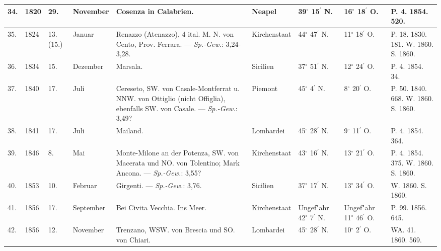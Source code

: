 \documentclass[a4paper, 8pt, oneside, polutonikogreek, german]{article}
\begin{document}
\begin{center}
\begin{longtable}{|p{3mm}|p{10mm}|p{5mm}|p{13mm}|p{25mm}|p{15mm}|p{10mm}|p{10mm}|p{11mm}|}
        34. & 1820 & 29. & November & Cosenza in Calabrien. & Neapel & 39$^\circ$ 15$^\prime$ N. & 16$^\circ$ 18$^\prime$ O. & P. 4. 1854. 520. \\ \hline
        35. & 1824 & 13. (15.) & Januar & Renazzo (Atenazzo), 4 ital. M. N. von Cento, Prov. Ferrara. --- \emph{Sp.-Gew.}: 3,24-3,28. & Kirchenstaat & 44$^\circ$ 47$^\prime$ N. & 11$^\circ$ 18$^\prime$ O. & P. 18. 1830. 181. W. 1860. S. 1860. \\ \hline
        36. & 1834 & 15. & Dezember & Marsala. & Sicilien & 37$^\circ$ 51$^\prime$ N. & 12$^\circ$ 24$^\prime$ O. & P. 4. 1854. 34. \\ \hline
        37. & 1840 & 17. & Juli & Cereseto, SW. von Casale-Montferrat u. NNW. von Ottiglio (nicht Offiglia), ebenfalls SW. von Casale. --- \emph{Sp.-Gew.}: 3,49? & Piemont & 45$^\circ$ 4$^\prime$ N. & 8$^\circ$ 20$^\prime$ O. & P. 50. 1840. 668. W. 1860. S. 1860. \\ \hline
        38. & 1841 & 17. & Juli & Mailand. & Lombardei & 45$^\circ$ 28$^\prime$ N. & 9$^\circ$ 11$^\prime$ O. & P. 4. 1854. 364. \\ \hline
        39. & 1846 & 8. & Mai & Monte-Milone an der Potenza, SW. von Macerata und NO. von Tolentino; Mark Ancona. --- \emph{Sp.-Gew.}: 3,55? & Kirchenstaat & 43$^\circ$ 16$^\prime$ N. & 13$^\circ$ 21$^\prime$ O. & P. 4. 1854. 375. W. 1860. S. 1860. \\ \hline
        40. & 1853 & 10. & Februar & Girgenti. --- \emph{Sp.-Gew.}: 3,76. & Sicilien & 37$^\circ$ 17$^\prime$ N. & 13$^\circ$ 34$^\prime$ O. & W. 1860. S. 1860. \\ \hline
        41. & 1856 & 17. & September & Bei Civita Vecchia. Ins Meer. & Kirchenstaat & Ungef"ahr 42$^\circ$ 7$^\prime$ N. & Ungef"ahr 11$^\circ$ 46$^\prime$ O. & P. 99. 1856. 645. \\ \hline
        42. & 1856 & 12. & November & Trenzano, WSW. von Brescia und SO. von Chiari. & Lombardei & 45$^\circ$ 28$^\prime$ N. & 10$^\circ$ 2$^\prime$ O. & WA. 41. 1860. 569. \\ \hline
    \end{longtable}
\end{center}
\end{document}

